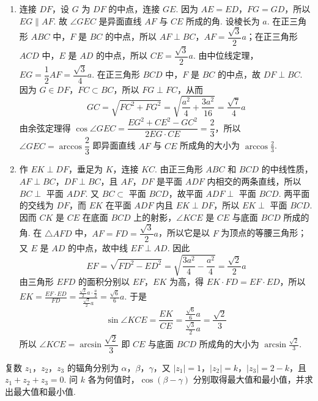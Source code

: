 \begin{solution}
\begin{enumerate}
\item 连接 \(DF\)，设 \(G\) 为 \(DF\) 的中点，连接 \(GE\). 因为 \(AE=ED\)，\(FG=GD\)，所以 \(EG\parallel AF\). 故 \(\angle GEC\) 是异面直线 \(AF\) 与 \(CE\) 所成的角. 设棱长为 \(a\). 在正三角形 \(ABC\) 中，\(F\) 是 \(BC\) 的中点，所以 \(AF\perp BC\)，\(AF=\dfrac{\sqrt{3}}{2}a\)；在正三角形 \(ACD\) 中，\(E\) 是 \(AD\) 的中点，所以 \(CE=\dfrac{\sqrt{3}}{2}a\). 由中位线定理，\(EG=\dfrac{1}{2}AF=\dfrac{\sqrt{3}}{4}a\).
在正三角形 \(BCD\) 中，\(F\) 是 \(BC\) 的中点，故 \(DF\perp BC\). 因为 \(G\in DF\)，\(FC\subset BC\)，所以 \(FG\perp FC\)，从而
\[
GC=\sqrt{FC^2+FG^2}=\sqrt{\frac{a^2}{4}+\frac{3a^2}{16}}=\frac{\sqrt{7}}{4}a
\]
由余弦定理得 \(\cos\angle GEC=\dfrac{EG^2+CE^2-GC^2}{2EG\cdot CE}=\dfrac{2}{3}\)，所以 \(\angle GEC=\arccos\dfrac{2}{3}\)
即异面直线 \(AF\) 与 \(CE\) 所成角的大小为 \(\arccos\frac{2}{3}\).

\item 作 \(EK\perp DF\)，垂足为 \(K\)，连接 \(KC\). 由正三角形 \(ABC\) 和 \(BCD\) 的中线性质，\(AF\perp BC\)，\(DF\perp BC\)，且 \(AF\)，\(DF\) 是平面 \(ADF\) 内相交的两条直线，所以 \(BC\perp\) 平面 \(ADF\). 又 \(BC\subset\) 平面 \(BCD\)，故平面 \(ADF\perp\) 平面 \(BCD\). 两平面的交线为 \(DF\)，而 \(EK\) 在平面 \(ADF\) 内且 \(EK\perp DF\)，所以 \(EK\perp\) 平面 \(BCD\). 因而 \(CK\) 是 \(CE\) 在底面 \(BCD\) 上的射影，\(\angle KCE\) 是 \(CE\) 与底面 \(BCD\) 所成的角.
在 \(\triangle AFD\) 中，\(AF=FD=\dfrac{\sqrt{3}}{2}a\)，所以它是以 \(F\) 为顶点的等腰三角形；又 \(E\) 是 \(AD\) 的中点，故中线 \(EF\perp AD\). 因此
\[
EF=\sqrt{FD^2-ED^2}=\sqrt{\frac{3a^2}{4}-\frac{a^2}{4}}=\frac{\sqrt{2}}{2}a
\]
由三角形 \(EFD\) 的面积分别以 \(EF\)，\(EK\) 为高，得 \(EK\cdot FD=EF\cdot ED\)，所以
\(EK=\frac{EF\cdot ED}{FD}=\frac{\frac{\sqrt{2}}{2}a\cdot\frac{a}{2}}{\frac{\sqrt{3}}{2}a}=\frac{\sqrt{6}}{6}a\).
于是
\[
\sin\angle KCE=\frac{EK}{CE}=\frac{\frac{\sqrt{6}}{6}a}{\frac{\sqrt{3}}{2}a}=\frac{\sqrt{2}}{3}
\]
所以 \(\angle KCE=\arcsin\dfrac{\sqrt{2}}{3}\)
即 \(CE\) 与底面 \(BCD\) 所成角的大小为 \(\arcsin\frac{\sqrt{2}}{3}\).
\end{enumerate}
\end{solution}

\begin{problem}
复数 \(z_1\)，\(z_2\)，\(z_3\) 的辐角分别为 \(\alpha\)，\(\beta\)，\(\gamma\)，又 \(|z_1|=1\)，\(|z_2|=k\)，\(|z_3|=2-k\)，且 \(z_1+z_2+z_3=0\). 问 \(k\) 各为何值时，\(\cos(\beta-\gamma)\) 分别取得最大值和最小值，并求出最大值和最小值.
\end{problem}

